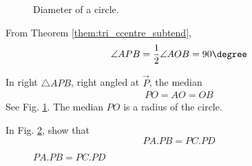 %
\begin{figure}[!ht]
	\begin{center}
		
		\resizebox{\columnwidth}{!}{}
	\end{center}
	\caption{Diameter of a circle.}
	\label{fig:circ_dia_rt}	
\end{figure}
%
\solution From Theorem \ref{them:tri_ccentre_subtend}, 
\begin{align}
\angle APB = \frac{1}{2}\angle AOB = 90\degree
\end{align}
%
\item In  right $\triangle APB$, right angled at $\vec{P}$, the median 
\begin{align}
PO = AO = OB
\end{align}
%
\solution See Fig. \ref{fig:circ_dia_rt}. The median $PO$ is a radius of the circle.
\item
	In Fig. \ref{fig:circ_chord_prod}, show that 
	\begin{equation}
	PA.PB = PC.PD
	\end{equation}
\begin{figure}[!ht]
	\begin{center}
		
		\resizebox{\columnwidth}{!}{}
	\end{center}
	\caption{$PA.PB = PC.PD$}
	\label{fig:circ_chord_prod}	
\end{figure}

